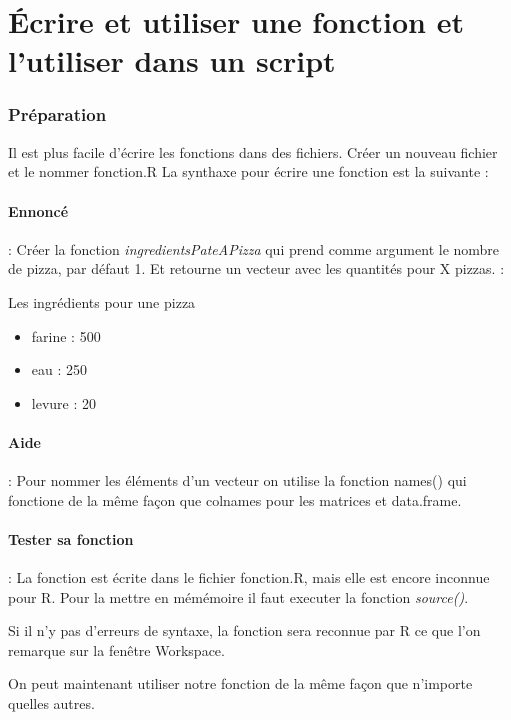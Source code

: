 \section{Écrire et utiliser une fonction et l'utiliser dans un script}
\subsubsection{Préparation}
Il est plus facile d'écrire les fonctions dans des fichiers. Créer un nouveau fichier et le nommer fonction.R
La synthaxe pour écrire une fonction est la suivante : 

\paragraph{Ennoncé} : Créer la fonction \emph{ingredientsPateAPizza} qui prend comme argument le nombre de pizza, par défaut 1. Et retourne un vecteur avec les quantités pour X pizzas. : 

Les ingrédients pour une pizza
\begin{itemize}
	\item farine : 500
	\item eau : 250
	\item levure : 20
\end{itemize}

\paragraph{Aide} : Pour nommer les éléments d'un vecteur on utilise la fonction names() qui fonctione de la même façon que colnames pour les matrices et data.frame.

\paragraph{Tester sa fonction} : La fonction est écrite dans le fichier fonction.R, mais elle est encore inconnue pour R. Pour la mettre en mémémoire il faut executer la fonction  \emph{source()}.

Si il n'y pas d'erreurs de syntaxe, la fonction sera reconnue par R ce que l'on remarque sur la fenêtre Workspace.
\par
On peut maintenant utiliser notre fonction de la même façon que n'importe quelles autres.

















